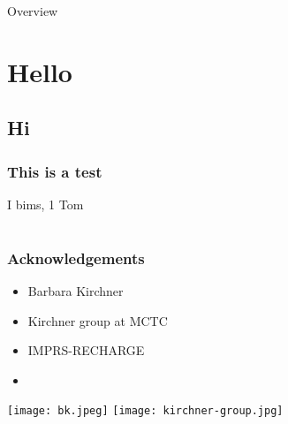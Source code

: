 \documentclass[t,
aspectratio=169,			%
]{beamer}
\begin{document}
\begin{frame}{Overview}
	\tableofcontents
\end{frame}

%   
\section{Hello}
\subsection{Hi}

\begin{frame}
	\frametitle{This is a test}

	I bims, 1 Tom
\end{frame}

\appendix
\section{}              %

\begin{frame}
	\frametitle{Acknowledgements}

	\begin{minipage}{.49\textwidth}
		\begin{itemize}
			\item Barbara Kirchner
			\item Kirchner group at MCTC
		\end{itemize}
	\end{minipage}
	\begin{minipage}{.49\textwidth}
		\begin{itemize}
			\item IMPRS-RECHARGE
			\item
		\end{itemize}
	\end{minipage}

	\begin{center}
		\texttt{[image: bk.jpeg]}
		\texttt{[image: kirchner-group.jpg]}
	\end{center}
\end{frame}
\end{document}
